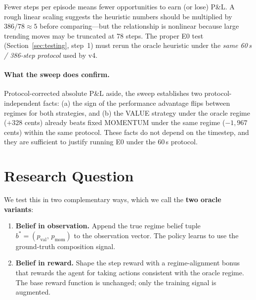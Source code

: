 \documentclass[11pt]{article}
\begin{document}
Fewer steps per episode means fewer opportunities to earn (or lose) P\&L.
A rough linear scaling suggests the heuristic numbers should be multiplied by
$386/78 \approx 5$ before comparing---but the relationship is nonlinear
because large trending moves may be truncated at 78 steps.
The proper E0 test (Section~\ref{sec:testing}, step~1) must rerun the oracle
heuristic under the \emph{same 60\,s / 386-step protocol} used by v4.

\paragraph{What the sweep does confirm.}
Protocol-corrected absolute P\&L aside, the sweep establishes two
protocol-independent facts: (a) the sign of the performance advantage flips
between regimes for both strategies, and (b) the VALUE strategy under the
oracle regime ($+328$ cents) already beats fixed MOMENTUM under the same
regime ($-1{,}967$ cents) within the same protocol.
These facts do not depend on the timestep, and they are sufficient to
justify running E0 under the 60\,s protocol.

\section{Research Question}

\begin{center}
\end{center}

\medskip
We test this in two complementary ways, which we call the \textbf{two
oracle variants}:

\begin{enumerate}
  \item \textbf{Belief in observation.} Append the true regime belief tuple
        $b^* = (p_\text{val},\, p_\text{mom})$ to the observation vector.
        The policy learns to use the ground-truth composition signal.
  \item \textbf{Belief in reward.} Shape the step reward with a
        regime-alignment bonus that rewards the agent for taking actions
        consistent with the oracle regime. The base reward function is
        unchanged; only the training signal is augmented.
\end{enumerate}
\end{document}
